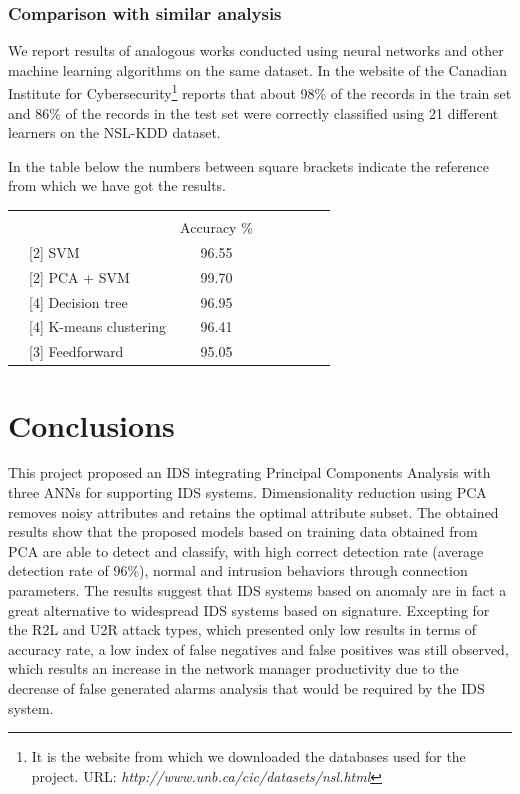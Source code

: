 \documentclass[twocolumn,11pt]{asme2ej}
\begin{document}
\subsubsection{Comparison with similar analysis}

We report results of analogous works conducted using neural networks and other machine learning algorithms on the same dataset. In the website of the Canadian Institute for Cybersecurity\footnote{It is the website from which we downloaded the databases used for the project. URL: \textit{http://www.unb.ca/cic/datasets/nsl.html}} reports that about 98\% of the records in the train set and 86\% of the records in the test set were correctly classified using 21 different learners on the NSL-KDD dataset.

In the table below the numbers between square brackets indicate the reference from which we have got the results.

\renewcommand{\arraystretch}{2}
\begin{tabular}{l|l|c|c|c|c|c|c}
\multicolumn{2}{c}{}&\multicolumn{5}{c}{}&\\
\cline{3-3}
\multicolumn{2}{c|}{}& Accuracy \%\\
\cline{2-3}
\multirow{2}{*}{}& [2] SVM & 96.55\\
\cline{2-3}
& [2] PCA + SVM & 99.70\\
\cline{2-3}
& [4] Decision tree & 96.95\\
\cline{2-3}
& [4] K-means clustering & 96.41\\
\cline{2-3}
& [3] Feedforward & 95.05\\
\cline{2-3}
\end{tabular}


\section{Conclusions}

This project proposed an IDS integrating Principal Components Analysis with three ANNs for supporting IDS systems. Dimensionality reduction using PCA removes noisy attributes and retains the optimal attribute subset. The obtained results show that the proposed models based on training data obtained from PCA are able to detect and classify, with high correct detection rate (average detection rate of 96\%), normal and intrusion behaviors through connection parameters. The results suggest that IDS systems based on anomaly are in fact a great alternative to widespread IDS systems based on signature. Excepting for the R2L and U2R attack types, which presented only low results in terms of accuracy rate, a low index of false negatives and false positives was still observed, which results an increase in the network manager productivity due to the decrease of false generated alarms analysis that would be required by the IDS system. 
 
\end{document}
